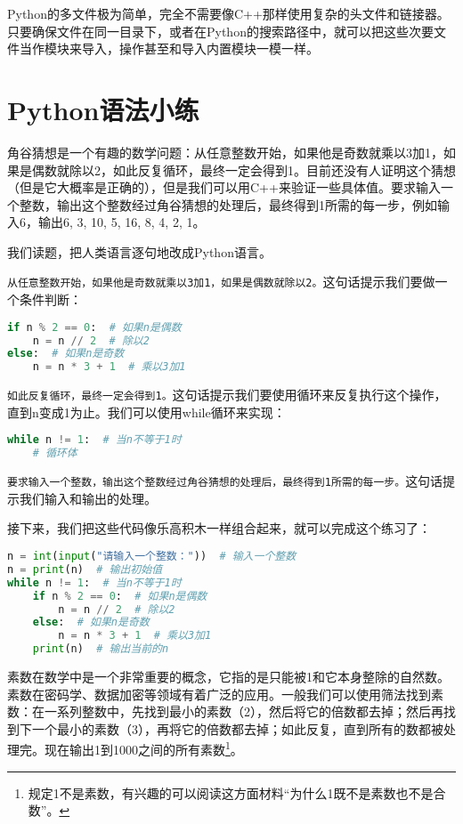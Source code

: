 Python的多文件极为简单，完全不需要像C++那样使用复杂的头文件和链接器。只要确保文件在同一目录下，或者在Python的搜索路径中，就可以把这些次要文件当作模块来导入，操作甚至和导入内置模块一模一样。

\section{Python语法小练}

\begin{example}
  角谷猜想是一个有趣的数学问题：从任意整数开始，如果他是奇数就乘以3加1，如果是偶数就除以2，如此反复循环，最终一定会得到1。目前还没有人证明这个猜想（但是它大概率是正确的），但是我们可以用C++来验证一些具体值。要求输入一个整数，输出这个整数经过角谷猜想的处理后，最终得到1所需的每一步，例如输入6，输出6, 3, 10, 5, 16, 8, 4, 2, 1。
\end{example}

\begin{answer}
  我们读题，把人类语言逐句地改成Python语言。

  \texttt{从任意整数开始，如果他是奇数就乘以3加1，如果是偶数就除以2。}这句话提示我们要做一个条件判断：
\begin{lstlisting}[language=python]
if n % 2 == 0:  # 如果n是偶数
    n = n // 2  # 除以2
else:  # 如果n是奇数
    n = n * 3 + 1  # 乘以3加1
\end{lstlisting}
  \texttt{如此反复循环，最终一定会得到1。}这句话提示我们要使用循环来反复执行这个操作，直到n变成1为止。我们可以使用while循环来实现：
\begin{lstlisting}[language=python]
while n != 1:  # 当n不等于1时
    # 循环体
\end{lstlisting}

  \texttt{要求输入一个整数，输出这个整数经过角谷猜想的处理后，最终得到1所需的每一步。}这句话提示我们输入和输出的处理。

  接下来，我们把这些代码像乐高积木一样组合起来，就可以完成这个练习了：
\begin{lstlisting}[language=python]
n = int(input("请输入一个整数："))  # 输入一个整数
n = print(n)  # 输出初始值
while n != 1:  # 当n不等于1时
    if n % 2 == 0:  # 如果n是偶数
        n = n // 2  # 除以2
    else:  # 如果n是奇数
        n = n * 3 + 1  # 乘以3加1
    print(n)  # 输出当前的n
\end{lstlisting}
\end{answer}

\begin{example}
  素数在数学中是一个非常重要的概念，它指的是只能被1和它本身整除的自然数。素数在密码学、数据加密等领域有着广泛的应用。一般我们可以使用筛法找到素数：在一系列整数中，先找到最小的素数（2），然后将它的倍数都去掉；然后再找到下一个最小的素数（3），再将它的倍数都去掉；如此反复，直到所有的数都被处理完。现在输出1到1000之间的所有素数\footnote{规定1不是素数，有兴趣的可以阅读这方面材料“为什么1既不是素数也不是合数”。}。
\end{example}

